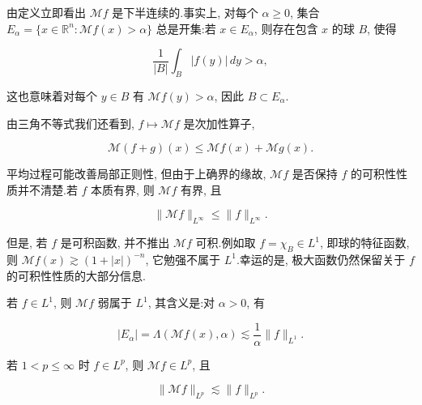 \begin{remark}\label{rem:c6-2.3}
由定义立即看出 $\mathcal{M}f$ 是下半连续的.事实上, 对每个 $\alpha\ge 0$, 集合 $E_\alpha = \{x\in\mathbb{R}^n : \mathcal{M}f(x) > \alpha\}$ 总是开集:若 $x\in E_\alpha$, 则存在包含 $x$ 的球 $B$, 使得

\begin{equation}
\frac{1}{|B|}\int_B |f(y)|\, dy > \alpha, \label{eq:c6-190}
\end{equation}

这也意味着对每个 $y\in B$ 有 $\mathcal{M}f(y) > \alpha$, 因此 $B\subset E_\alpha$.
\end{remark}

由三角不等式我们还看到, $f\mapsto\mathcal{M}f$ 是次加性算子,

\begin{equation}
\mathcal{M}(f+g)(x) \le \mathcal{M}f(x) + \mathcal{M}g(x).\label{eq:c6-191}
\end{equation}

平均过程可能改善局部正则性, 但由于上确界的缘故, $\mathcal{M}f$ 是否保持 $f$ 的可积性性质并不清楚.若 $f$ 本质有界, 则 $\mathcal{M}f$ 有界, 且

\begin{equation}
\|\mathcal{M}f\|_{L^\infty} \le \|f\|_{L^\infty}.\label{eq:c6-192}
\end{equation}

但是, 若 $f$ 是可积函数, 并不推出 $\mathcal{M}f$ 可积.例如取 $f = \chi_B\in L^1$, 即球的特征函数, 则 $\mathcal{M}f(x)\gtrsim(1+|x|)^{-n}$, 它勉强不属于 $L^1$.幸运的是, 极大函数仍然保留关于 $f$ 的可积性性质的大部分信息.

\begin{theorem}\label{thm:c6-2.4}
若 $f\in L^1$, 则 $\mathcal{M}f$ 弱属于 $L^1$, 其含义是:对 $\alpha>0$, 有

\begin{equation}
|E_\alpha| = \Lambda(\mathcal{M}f(x), \alpha) \lesssim \frac{1}{\alpha}\|f\|_{L^1}.\label{eq:c6-193}
\end{equation}

若 $1<p\le\infty$ 时 $f\in L^p$, 则 $\mathcal{M}f\in L^p$, 且

\begin{equation}
\|\mathcal{M}f\|_{L^p} \lesssim \|f\|_{L^p}.\label{eq:c6-194}
\end{equation}
\end{theorem}

